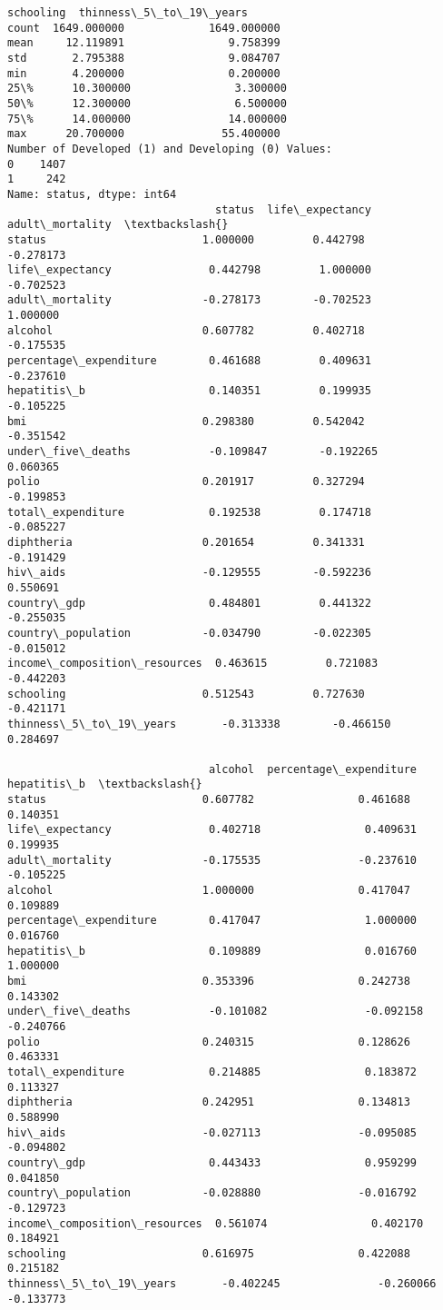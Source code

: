 \documentclass[11pt]{article}
\begin{document}
\begin{Verbatim}[commandchars=\\\{\}]
         schooling  thinness\_5\_to\_19\_years
count  1649.000000             1649.000000
mean     12.119891                9.758399
std       2.795388                9.084707
min       4.200000                0.200000
25\%      10.300000                3.300000
50\%      12.300000                6.500000
75\%      14.000000               14.000000
max      20.700000               55.400000
Number of Developed (1) and Developing (0) Values:
0    1407
1     242
Name: status, dtype: int64
                                status  life\_expectancy  adult\_mortality  \textbackslash{}
status                        1.000000         0.442798        -0.278173
life\_expectancy               0.442798         1.000000        -0.702523
adult\_mortality              -0.278173        -0.702523         1.000000
alcohol                       0.607782         0.402718        -0.175535
percentage\_expenditure        0.461688         0.409631        -0.237610
hepatitis\_b                   0.140351         0.199935        -0.105225
bmi                           0.298380         0.542042        -0.351542
under\_five\_deaths            -0.109847        -0.192265         0.060365
polio                         0.201917         0.327294        -0.199853
total\_expenditure             0.192538         0.174718        -0.085227
diphtheria                    0.201654         0.341331        -0.191429
hiv\_aids                     -0.129555        -0.592236         0.550691
country\_gdp                   0.484801         0.441322        -0.255035
country\_population           -0.034790        -0.022305        -0.015012
income\_composition\_resources  0.463615         0.721083        -0.442203
schooling                     0.512543         0.727630        -0.421171
thinness\_5\_to\_19\_years       -0.313338        -0.466150         0.284697

                               alcohol  percentage\_expenditure  hepatitis\_b  \textbackslash{}
status                        0.607782                0.461688     0.140351
life\_expectancy               0.402718                0.409631     0.199935
adult\_mortality              -0.175535               -0.237610    -0.105225
alcohol                       1.000000                0.417047     0.109889
percentage\_expenditure        0.417047                1.000000     0.016760
hepatitis\_b                   0.109889                0.016760     1.000000
bmi                           0.353396                0.242738     0.143302
under\_five\_deaths            -0.101082               -0.092158    -0.240766
polio                         0.240315                0.128626     0.463331
total\_expenditure             0.214885                0.183872     0.113327
diphtheria                    0.242951                0.134813     0.588990
hiv\_aids                     -0.027113               -0.095085    -0.094802
country\_gdp                   0.443433                0.959299     0.041850
country\_population           -0.028880               -0.016792    -0.129723
income\_composition\_resources  0.561074                0.402170     0.184921
schooling                     0.616975                0.422088     0.215182
thinness\_5\_to\_19\_years       -0.402245               -0.260066    -0.133773


\end{Verbatim}
\end{document}
